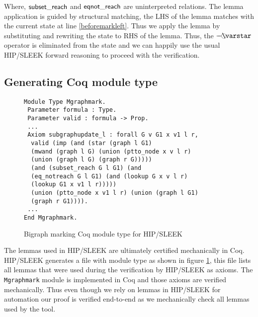 Where, $\mathsf{subset\_reach}$ and $\mathsf{eqnot\_reach}$ are uninterpreted relations. The lemma application is guided by structural matching, the LHS of the lemma matches with the current state at line \ref{beforemarkleft}. Thus we apply the lemma by substituting and rewriting the state to RHS of the lemma. Thus, the $\septraction$ operator is eliminated from the state and we can happily use the usual HIP/SLEEK forward reasoning to proceed with the verification.

\subsection{Generating Coq module type}

\begin{figure}[t]
  \begin{lstlisting}
Module Type Mgraphmark.
 Parameter formula : Type.
 Parameter valid : formula -> Prop.
 ...
 Axiom subgraphupdate_l : forall G v G1 x v1 l r,
  valid (imp (and (star (graph l G1)
  (mwand (graph l G) (union (ptto_node x v l r)
  (union (graph l G) (graph r G)))))
  (and (subset_reach G l G1) (and
  (eq_notreach G l G1) (and (lookup G x v l r)
  (lookup G1 x v1 l r)))))
  (union (ptto_node x v1 l r) (union (graph l G1)
  (graph r G1)))).
 ...
End Mgraphmark.
\end{lstlisting}
\caption{Bigraph marking Coq module type for HIP/SLEEK}
\label{fig:hipcoqfile}
\end{figure}

The lemmas used in HIP/SLEEK are ultimately certified mechanically in Coq. HIP/SLEEK generates a file with module type as shown in figure \ref{fig:hipcoqfile}, this file lists all lemmas that were used during the verification by HIP/SLEEK as axioms. The \texttt{Mgraphmark} module is implemented in Coq and those axioms are verified mechanically. Thus even though we rely on lemmas in HIP/SLEEK for automation our proof is verified end-to-end as we mechanically check all lemmas used by the tool. 